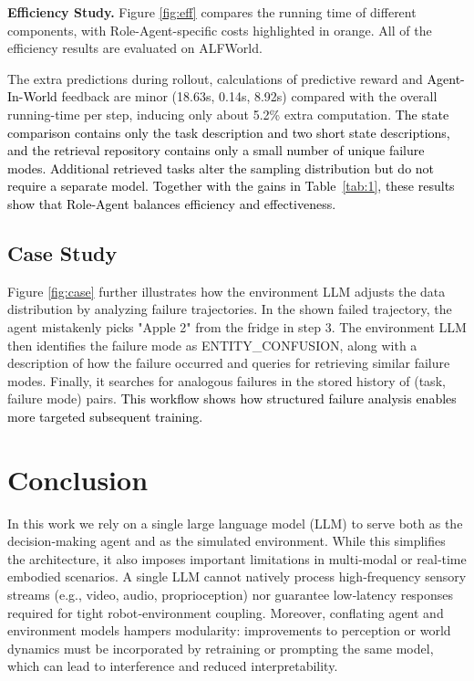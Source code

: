 \documentclass[11pt]{article}
\begin{document}
\noindent\textbf{Efficiency Study.} Figure \ref{fig:eff} compares the running time of different components, with Role-Agent-specific costs highlighted in orange. All of the efficiency results are evaluated on ALFWorld.

The extra predictions during rollout, calculations of predictive reward and \textcolor{black}{Agent-In-World} feedback are  minor (18.63s, 0.14s, 8.92s) compared with the overall running-time per step, inducing only about 5.2\% extra computation. \textcolor{black}{The state comparison contains only the task description and two short state descriptions, and the retrieval repository contains only a small number of unique failure modes. Additional retrieved tasks alter the sampling distribution but do not require a separate model.} \textcolor{black}{Together with the gains in Table~\ref{tab:1}, these results show that Role-Agent balances efficiency and effectiveness.} 
 


\subsection{Case Study}
Figure \ref{fig:case} further illustrates how the environment LLM adjusts the data distribution by analyzing failure trajectories. In the shown failed trajectory, the agent mistakenly picks "Apple 2" from the fridge in step 3. The environment LLM then identifies the failure mode as ENTITY\_CONFUSION, along with a description of how the failure occurred and queries for retrieving similar failure modes. Finally, it searches for analogous failures in the stored history of (task, failure mode) pairs. \textcolor{black}{This workflow shows how structured failure analysis enables more targeted subsequent training.}
 
\section{Conclusion}

In this work we rely on a single large language model (LLM) to serve both as the decision‑making agent and as the simulated environment. While this simplifies the architecture, it also imposes important limitations in multi‑modal or real‑time embodied scenarios. A single LLM cannot natively process high‑frequency sensory streams (e.g., video, audio, proprioception) nor guarantee low‑latency responses required for tight robot‑environment coupling. Moreover, conflating agent and environment models hampers modularity: improvements to perception or world dynamics must be incorporated by retraining or prompting the same model, which can lead to interference and reduced interpretability.
\end{document}
